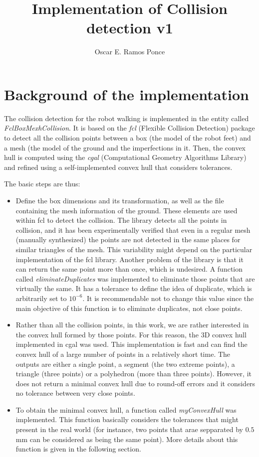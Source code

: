 \documentclass[11pt,a4paper]{article}
\title{\textbf{Implementation of Collision detection v1}}
\author{Oscar E. Ramos Ponce
}
\date{}
\begin{document}
\maketitle

\section{Background of the implementation}

The collision detection for the robot walking is implemented in the entity called \textit{FclBoxMexhCollision}. It is based on the \textit{fcl} (Flexible Collision Detection) package to detect all the collision points between a box (the model of the robot feet) and a mesh (the model of the ground and the imperfections in it. Then, the convex hull is computed using the \textit{cgal} (Computational Geometry Algorithms Library) and refined using a self-implemented convex hull that considers tolerances.

The basic steps are thus:
\begin{itemize}
  \item Define the box dimensions and its transformation, as well as the file containing the mesh information of the ground. These elements are used within fcl to detect the collision. The library detects all the points in collision, and it has been experimentally verified that even in a regular mesh (manually synthesized) the points are not detected in the same places for similar triangles of the mesh. This variability might depend on the particular implementation of the fcl library. Another problem of the library is that it can return the same point more than once, which is undesired. A function called \textit{eliminateDuplicates} was implemented to eliminate those points that are virtually the same. It has a tolerance to define the idea of duplicate, which is arbitrarily set to $10^{-6}$. It is recommendable not to change this value since the main objective of this function is to eliminate duplicates, not close points.
  \item Rather than all the collision points, in this work, we are rather interested in the convex hull formed by those points. For this reason, the 3D convex hull implemented in cgal was used. This implementation is fast and can find the convex hull of a large number of points in a relatively short time. The outputs are either a single point, a segment (the two extreme points), a triangle (three points) or a polyhedron (more than three points). However, it does not return a minimal convex hull due to round-off errors and it considers no tolerance between very close points. 
  \item To obtain the minimal convex hull, a function called \textit{myConvexHull} was implemented. This function basically considers the tolerances that might present in the real world (for instance, two points that arae sepparated by $0.5$mm can be considered as being the same point). More details about this function is given in the following section. 
\end{itemize}
\end{document}
